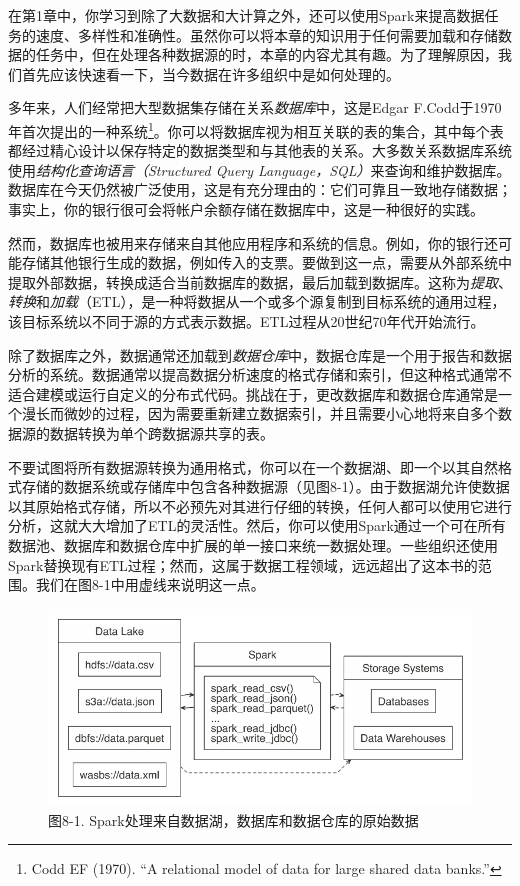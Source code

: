 \documentclass[
]{article}
\begin{document}
在第1章中，你学习到除了大数据和大计算之外，还可以使用Spark来提高数据任务的速度、多样性和准确性。虽然你可以将本章的知识用于任何需要加载和存储数据的任务中，但在处理各种数据源的时，本章的内容尤其有趣。为了理解原因，我们首先应该快速看一下，当今数据在许多组织中是如何处理的。

多年来，人们经常把大型数据集存储在关系\emph{数据库}中，这是Edgar
F.Codd于1970年首次提出的一种系统\footnote{Codd EF (1970). ``A relational
  model of data for large shared data banks.''}。你可以将数据库视为相互关联的表的集合，其中每个表都经过精心设计以保存特定的数据类型和与其他表的关系。大多数关系数据库系统使用\emph{结构化查询语言（Structured
Query
Language，SQL）}来查询和维护数据库。数据库在今天仍然被广泛使用，这是有充分理由的：它们可靠且一致地存储数据；事实上，你的银行很可会将帐户余额存储在数据库中，这是一种很好的实践。

然而，数据库也被用来存储来自其他应用程序和系统的信息。例如，你的银行还可能存储其他银行生成的数据，例如传入的支票。要做到这一点，需要从外部系统中提取外部数据，转换成适合当前数据库的数据，最后加载到数据库。这称为\emph{提取}、\emph{转换}和\emph{加载}（ETL），是一种将数据从一个或多个源复制到目标系统的通用过程，该目标系统以不同于源的方式表示数据。ETL过程从20世纪70年代开始流行。

除了数据库之外，数据通常还加载到\emph{数据仓库}中，数据仓库是一个用于报告和数据分析的系统。数据通常以提高数据分析速度的格式存储和索引，但这种格式通常不适合建模或运行自定义的分布式代码。挑战在于，更改数据库和数据仓库通常是一个漫长而微妙的过程，因为需要重新建立数据索引，并且需要小心地将来自多个数据源的数据转换为单个跨数据源共享的表。

不要试图将所有数据源转换为通用格式，你可以在一个数据湖、即一个以其自然格式存储的数据系统或存储库中包含各种数据源（见图8-1）。由于数据湖允许使数据以其原始格式存储，所以不必预先对其进行仔细的转换，任何人都可以使用它进行分析，这就大大增加了ETL的灵活性。然后，你可以使用Spark通过一个可在所有数据池、数据库和数据仓库中扩展的单一接口来统一数据处理。一些组织还使用Spark替换现有ETL过程；然而，这属于数据工程领域，远远超出了这本书的范围。我们在图8-1中用虚线来说明这一点。

\begin{figure}
\centering
\includegraphics{figures/8_1.png}
\caption{图8-1. Spark处理来自数据湖，数据库和数据仓库的原始数据}
\end{figure}
\end{document}

